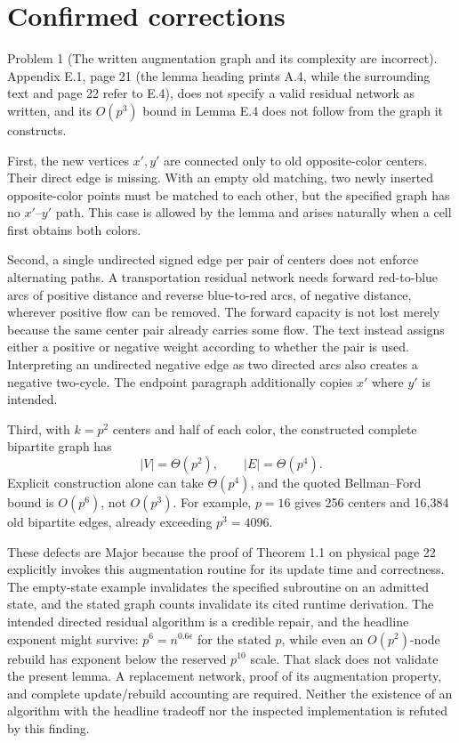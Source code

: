 \documentclass[10pt]{article}
\begin{document}
\section*{Confirmed corrections}
Problem 1 (The written augmentation graph and its complexity are incorrect).  Appendix E.1, page 21 (the lemma heading prints A.4, while the surrounding text and page 22 refer to E.4), does not specify a valid residual network as written, and its \(O(p^3)\) bound in Lemma E.4 does not follow from the graph it constructs.\par
First, the new vertices \(x',y'\) are connected only to old opposite-color centers. Their direct edge is missing. With an empty old matching, two newly inserted opposite-color points must be matched to each other, but the specified graph has no \(x'\)–\(y'\) path. This case is allowed by the lemma and arises naturally when a cell first obtains both colors.\par
Second, a single undirected signed edge per pair of centers does not enforce alternating paths. A transportation residual network needs forward red-to-blue arcs of positive distance and reverse blue-to-red arcs, of negative distance, wherever positive flow can be removed. The forward capacity is not lost merely because the same center pair already carries some flow. The text instead assigns either a positive or negative weight according to whether the pair is used. Interpreting an undirected negative edge as two directed arcs also creates a negative two-cycle. The endpoint paragraph additionally copies \(x'\) where \(y'\) is intended.\par
Third, with \(k=p^2\) centers and half of each color, the constructed complete bipartite graph has \[|V|=\Theta(p^2),\qquad |E|=\Theta(p^4).\] Explicit construction alone can take \(\Theta(p^4)\), and the quoted Bellman–Ford bound is \(O(p^6)\), not \(O(p^3)\). For example, \(p=16\) gives 256 centers and 16,384 old bipartite edges, already exceeding \(p^3=4096\).\par
These defects are Major because the proof of Theorem 1.1 on physical page 22 explicitly invokes this augmentation routine for its update time and correctness. The empty-state example invalidates the specified subroutine on an admitted state, and the stated graph counts invalidate its cited runtime derivation. The intended directed residual algorithm is a credible repair, and the headline exponent might survive: \(p^6=n^{0.6\epsilon}\) for the stated \(p\), while even an \(O(p^2)\)-node rebuild has exponent below the reserved \(p^{10}\) scale. That slack does not validate the present lemma. A replacement network, proof of its augmentation property, and complete update/rebuild accounting are required. Neither the existence of an algorithm with the headline tradeoff nor the inspected implementation is refuted by this finding.\par
\end{document}
